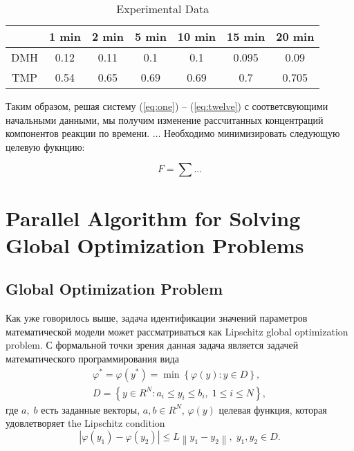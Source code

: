 \documentclass{svproc}
\begin{document}
\begin{table}
\label{table1}
\caption{Experimental Data}
\begin{center}
\begin{tabular}{ccccccc}
\hline
& 1 min & 2 min & 5 min & 10 min & 15 min & 20 min  \\
\hline\rule{0pt}{12pt}
DMH & 0.12 & 0.11 & 0.1	& 0.1 &	0.095 &	0.09  \\
TMP & 0.54 & 0.65 & 0.69 & 0.69 & 0.7 & 0.705 \\[2pt]
\hline
\end{tabular}
\end{center}
\end{table}

Таким образом, решая систему (\ref{eq:one}) -- (\ref{eq:twelve}) с соответсвующими начальными данными, мы получим изменение рассчитанных концентраций компонентов реакции по времени. ...
Необходимо минимизировать следующую целевую фукнцию:

\begin{equation}
  F = \sum ...
  \label{eq:objective_func}
\end{equation}


\section{Parallel Algorithm for Solving Global Optimization Problems }\label{Sec_GSA}

\subsection{Global Optimization Problem}

Как уже говорилось выше, задача идентификации значений параметров математической модели может рассматриваться как Lipschitz global optimization problem. 
С формальной точки зрения  данная задача является задачей математического программирования вида
\begin{gather}
 \varphi^* = \varphi(y^\ast)=\min{\left\{\varphi(y):y\in D\right\}}, \label{problemN}\\
 D=\left\{y\in R^N: a_i\leq y_i \leq b_i, \;  1\leq i \leq N\right\} \label{D},
\end{gather}
где $a,\; b$ есть заданные векторы, $a,b\in R^N$, $\varphi(y)$ целевая функция, которая удовлетворяет the Lipschitz condition
\begin{equation}\label{Lip}
\left|\varphi(y_1)-\varphi(y_2)\right|\leq L\left\|y_1-y_2\right\|,\; y_1,y_2 \in D.
\end{equation}
\end{document}
